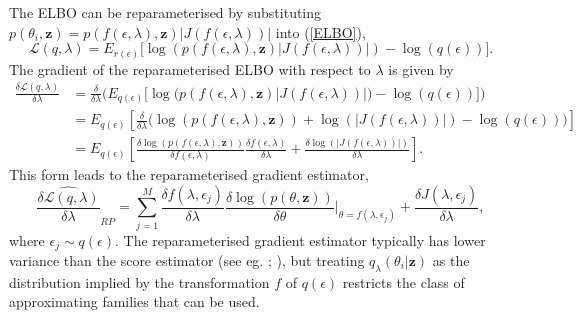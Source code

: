 \documentclass[12pt,a4paper]{article}\usepackage[]{graphicx}\usepackage[]{color}
\begin{document}
The ELBO can be reparameterised by substituting $p(\theta_i, \textbf{z}) = p(f(\epsilon, \lambda), \textbf{z})|J(f(\epsilon, \lambda))|$ into (\ref{ELBO}),
\begin{equation}
\label{rpELBO}
\mathcal{L}(q, \lambda) = E_{r(\epsilon)} \bigg[\log(p(f(\epsilon,\lambda), \textbf{z})|J(f(\epsilon, \lambda))|) - \log(q(\epsilon))\bigg].
\end{equation}
The gradient of the reparameterised ELBO with respect to $\lambda$ is given by 
\begin{align}
\label{rpELBODeriv}
\frac{\delta\mathcal{L}(q, \lambda)}{\delta \lambda} &= \frac{\delta}{\delta \lambda} \bigg( E_{q(\epsilon)} \bigg[\log\big(p(f(\epsilon,\lambda), \textbf{z})|J(f(\epsilon, \lambda))|\big) - \log(q(\epsilon))\bigg] \bigg) \nonumber \\
&= E_{q(\epsilon)} \left[ \frac{\delta}{\delta \lambda} \bigg(\log(p(f(\epsilon,\lambda), \textbf{z})) + \log(|J(f(\epsilon, \lambda))|) - \log(q(\epsilon)) \bigg)\right] \nonumber \\
&= E_{q(\epsilon)} \left[ \frac{\delta \log(p(f(\epsilon,\lambda), \textbf{z}))}{\delta f(\epsilon,\lambda)} \frac{\delta f(\epsilon,\lambda)}{\delta \lambda}  + \frac{\delta \log(|J(f(\epsilon, \lambda))|)}{\delta \lambda} \right].
\end{align}
This form leads to the reparameterised gradient estimator,
\begin{equation}
\label{rpDeriv}
\widehat{\frac{\delta\mathcal{L}(q, \lambda)}{\delta \lambda}}_{RP} = \sum_{j = 1}^M \frac{\delta f(\lambda, \epsilon_j)}{\delta \lambda} \frac{\delta \log(p(\theta, \textbf{z}))}{\delta \theta} \bigg\rvert_{\theta = f(\lambda, \epsilon_j)} + \frac{\delta J(\lambda, \epsilon_j)}{\delta \lambda}, 
\end{equation}
where $\epsilon_j \sim q(\epsilon)$. The reparameterised gradient estimator typically has lower variance than the score estimator (see eg. \cite{Rezende2014}; \cite{Ruiz2016}), but treating $q_{\lambda}(\theta_i | \textbf{z})$ as the distribution implied by the transformation $f$ of $q(\epsilon)$ restricts the class of approximating families that can be used.
\\
\end{document}
